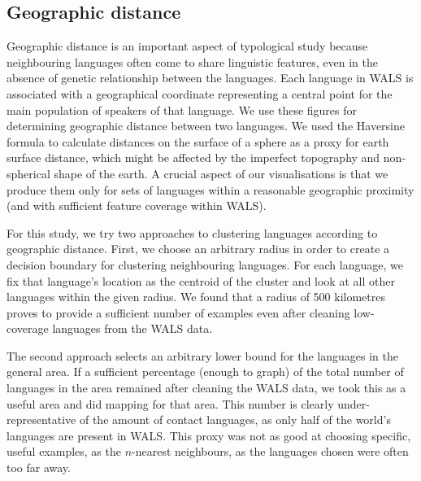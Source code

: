 \documentclass[11pt]{article}
\begin{document}
\subsection{Geographic distance}
Geographic distance is an important aspect of typological study because neighbouring  languages often come to share linguistic features, even in the absence of genetic relationship between the languages. Each language in WALS is associated with a geographical coordinate representing a central point for the main population of speakers of that language. We use these figures for determining geographic distance between two languages. We used the Haversine formula to calculate distances on the surface of a sphere as a proxy for earth surface distance, which might be affected by the imperfect topography and non-spherical shape of the earth.
A crucial aspect of our visualisations is that we produce them only for sets of languages within a reasonable geographic proximity (and with sufficient feature coverage within WALS).

For this study, we try two approaches to clustering languages according to geographic distance. First, we choose an arbitrary radius in order to create a decision boundary for clustering neighbouring languages. For each language, we fix that language's location as the centroid of the cluster and look at all other languages within the given radius. We found that a radius of 500 kilometres proves to provide a sufficient number of examples even after cleaning low-coverage languages from the WALS data. 

The second approach selects an arbitrary lower bound for the languages in the general area. If a sufficient percentage (enough to graph) of the total number of languages in the area remained after cleaning the WALS data, we took this as a useful area and did mapping for that area. This number is clearly under-representative of the amount of contact languages, as only half of the world's languages are present in WALS. This proxy was not as good at choosing specific, useful examples, as the $n$-nearest neighbours, as the languages chosen were often too far away. 
\end{document}
